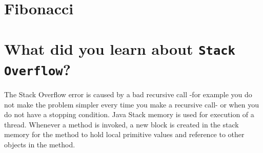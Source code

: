 \documentclass[a4paper,12pt]{article}
\begin{document}
    \section{Fibonacci}
    \begin{figure}[ht]
      \begin{floatrow}
      \end{floatrow}
    \end{figure}


    \section{What did you learn about \texttt{Stack Overflow}?}
      The Stack Overflow error is caused by a bad recursive call -for example you do not make
      the problem simpler every time you make a recursive call- or when you do not have a stopping
      condition.\cite{StackOverflow} Java Stack memory is used for execution of a thread.
      Whenever a method is invoked, a new block is created in the stack memory for the method to hold
      local primitive values and reference to other objects in the method.\cite{HeapStack}


    \newpage
    
    
\end{document}
